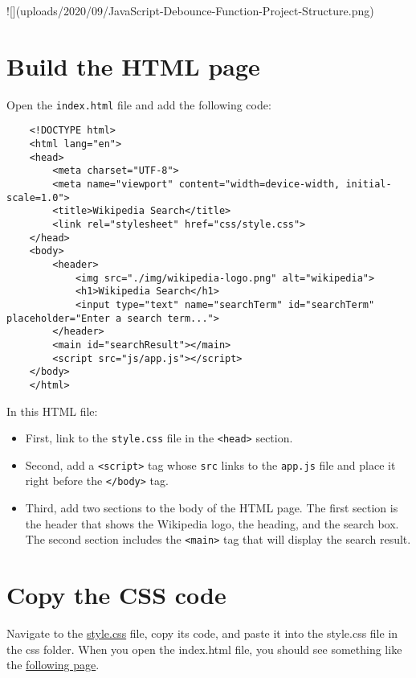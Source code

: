 \documentclass[11pt]{article}
\begin{document}
![](uploads/2020/09/JavaScript-Debounce-Function-Project-Structure.png)

\section*{Build the HTML page}

Open the \verb|index.html| file and add the following code:

\begin{lstlisting}
    <!DOCTYPE html>
    <html lang="en">
    <head>
        <meta charset="UTF-8">
        <meta name="viewport" content="width=device-width, initial-scale=1.0">
        <title>Wikipedia Search</title>
        <link rel="stylesheet" href="css/style.css">
    </head>
    <body>
        <header>
            <img src="./img/wikipedia-logo.png" alt="wikipedia">
            <h1>Wikipedia Search</h1>
            <input type="text" name="searchTerm" id="searchTerm" placeholder="Enter a search term...">
        </header>
        <main id="searchResult"></main>
        <script src="js/app.js"></script>
    </body>
    </html>
\end{lstlisting}

In this HTML file:

\begin{itemize}
\item First, link to the \verb|style.css| file in the \verb|<head>| section.
\item Second, add a \verb|<script>| tag whose \verb|src| links to the \verb|app.js| file
and place it right before the \verb|</body>| tag.
\item Third, add two sections to the body of the HTML page.
The first section is the header that shows the Wikipedia logo, the
heading, and the search box. The second section includes the \verb|<main>|
tag that will display the search result.
\end{itemize}

\section*{Copy the CSS code}

Navigate to the \href{https://www.javascripttutorial.net/sample/dom/wikipedia-search/css/style.css}{style.css} file, copy its code, and paste it into the
style.css file in the css folder. When you open the index.html file,
you should see something like the \href{https://www.javascripttutorial.net/sample/dom/wikipedia-search/}{following page}.
\end{document}
